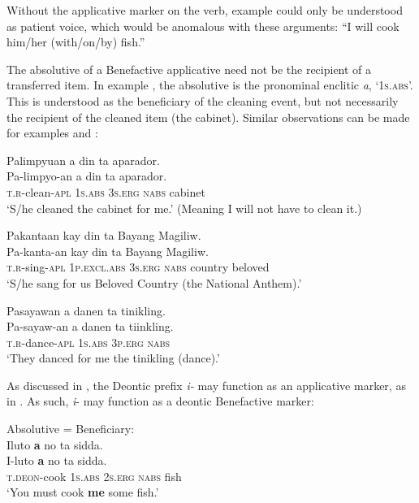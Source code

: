 Without the applicative marker on the verb, example  could only be understood as patient voice, which would be anomalous with these arguments: “I will cook him/her (with/on/by) fish.”

The absolutive of a Benefactive applicative need not be the recipient of a transferred item. In example , the absolutive is the pronominal enclitic \textit{a}, `1\textsc{s.abs}'. This is understood as the beneficiary of the cleaning event, but not necessarily the recipient of the cleaned item (the cabinet). Similar observations can be made for examples  and :

\ea
\label{ex:thecabinet}
Palimpyuan a din ta aparador. \\\smallskip
\gll Pa-limpyo-an a din ta aparador. \\
\textsc{t.r}-clean-\textsc{apl} 1\textsc{s.abs} 3\textsc{s.erg} \textsc{nabs} cabinet \\
\glt `S/he cleaned the cabinet for me.' (Meaning I will not have to clean it.)
\z

\ea
\label{ex:nationalanthem}
Pakantaan kay din ta Bayang Magiliw. \\\smallskip
\gll Pa-kanta-an kay din ta Bayang Magiliw. \\
\textsc{t.r}-sing-\textsc{apl} 1\textsc{p.excl.abs} 3\textsc{s.erg} \textsc{nabs} country beloved \\
\glt `S/he sang for us Beloved Country (the National Anthem).'
\z

\ea
\label{ex:thetikling}
Pasayawan a danen ta tinikling. \\\smallskip
\gll Pa-sayaw-an a danen ta tiinkling. \\
\textsc{t.r}-dance-\textsc{apl} 1\textsc{s.abs} 3\textsc{p.erg} \textsc{nabs} \\
\glt `They danced for me the tinikling (dance).'
\z

As discussed in ,  the Deontic prefix \textit{i-} may function as an applicative marker, as in . As such, \textit{i}- may function as a deontic Benefactive marker:

\ea
  \label{bkm:Ref500489008}
Absolutive = Beneficiary: \\
Iluto \textbf{a}  no  ta  sidda. \\\smallskip
\gll I-luto \textbf{a}  no  ta  sidda. \\
\textsc{t.deon}-cook 1\textsc{s.abs}  2\textsc{s.erg}  \textsc{nabs}  fish \\
\glt ‘You must cook \textbf{me} some fish.’
\z

